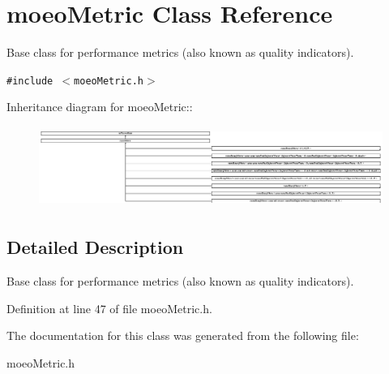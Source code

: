 \section{moeo\-Metric Class Reference}
\label{classmoeoMetric}
Base class for performance metrics (also known as quality indicators).  


{\tt \#include $<$moeo\-Metric.h$>$}

Inheritance diagram for moeo\-Metric::\begin{figure}[H]
\begin{center}
\leavevmode
\includegraphics[height=2.65907cm]{classmoeoMetric}
\end{center}
\end{figure}


\subsection{Detailed Description}
Base class for performance metrics (also known as quality indicators). 



Definition at line 47 of file moeo\-Metric.h.

The documentation for this class was generated from the following file:\begin{CompactItemize}
\item 
moeo\-Metric.h\end{CompactItemize}
